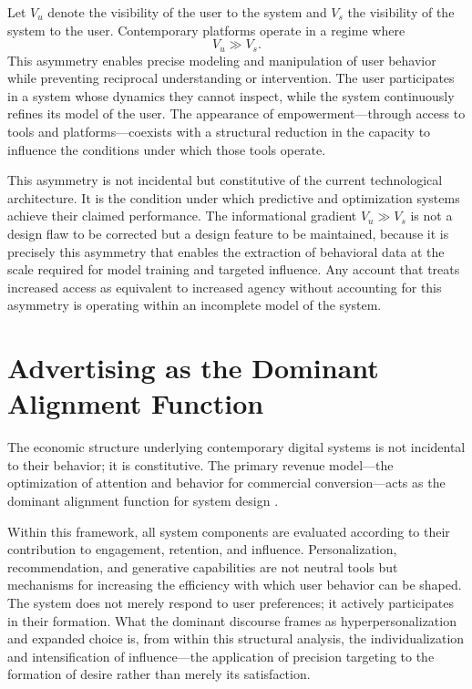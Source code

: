 \documentclass[12pt, a4paper]{article}
\begin{document}
Let $V_u$ denote the visibility of the user to the system and $V_s$ the visibility of the system to the user. Contemporary platforms operate in a regime where
\[
V_u \gg V_s.
\]
This asymmetry enables precise modeling and manipulation of user behavior while preventing reciprocal understanding or intervention. The user participates in a system whose dynamics they cannot inspect, while the system continuously refines its model of the user. The appearance of empowerment---through access to tools and platforms---coexists with a structural reduction in the capacity to influence the conditions under which those tools operate.

This asymmetry is not incidental but constitutive of the current technological architecture. It is the condition under which predictive and optimization systems achieve their claimed performance. The informational gradient $V_u \gg V_s$ is not a design flaw to be corrected but a design feature to be maintained, because it is precisely this asymmetry that enables the extraction of behavioral data at the scale required for model training and targeted influence. Any account that treats increased access as equivalent to increased agency without accounting for this asymmetry is operating within an incomplete model of the system.

\section{Advertising as the Dominant Alignment Function}

The economic structure underlying contemporary digital systems is not incidental to their behavior; it is constitutive. The primary revenue model---the optimization of attention and behavior for commercial conversion---acts as the dominant alignment function for system design \cite{Goodhart1975,Zuboff2019}.

Within this framework, all system components are evaluated according to their contribution to engagement, retention, and influence. Personalization, recommendation, and generative capabilities are not neutral tools but mechanisms for increasing the efficiency with which user behavior can be shaped. The system does not merely respond to user preferences; it actively participates in their formation. What the dominant discourse frames as hyperpersonalization and expanded choice is, from within this structural analysis, the individualization and intensification of influence---the application of precision targeting to the formation of desire rather than merely its satisfaction.
\end{document}
